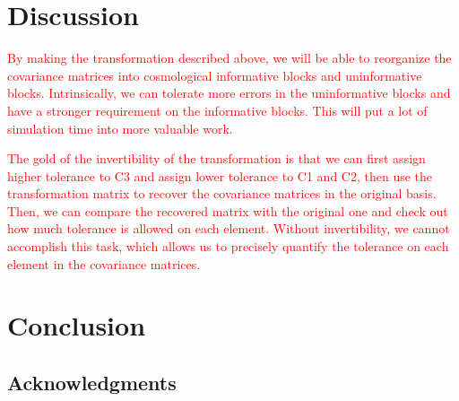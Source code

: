 \documentclass[twocolumn]{\docclass}
\begin{document}
	
	
	
	
	
	\section{Discussion}
	\label{sec:discussion}
	
	
	\textcolor{red}{By making the transformation described above, we will be able to reorganize the covariance matrices into cosmological informative blocks and uninformative blocks. Intrinsically, we can tolerate more errors in the uninformative blocks and have a stronger requirement on the informative blocks. This will put a lot of simulation time into more valuable work.}
	
	\textcolor{red}{The gold of the invertibility of the transformation is that we can first assign higher tolerance to C3 and assign lower tolerance to C1 and C2, then use the transformation matrix to recover the covariance matrices in the original basis. Then, we can compare the recovered matrix with the original one and check out how much tolerance is allowed on each element. Without invertibility, we cannot accomplish this task, which allows us to precisely quantify the tolerance on each element in the covariance matrices.}
	
	
	
	\section{Conclusion}
	\label{sec:conclusion}
	
	
	
	\subsection*{Acknowledgments}
	
	
\end{document}
